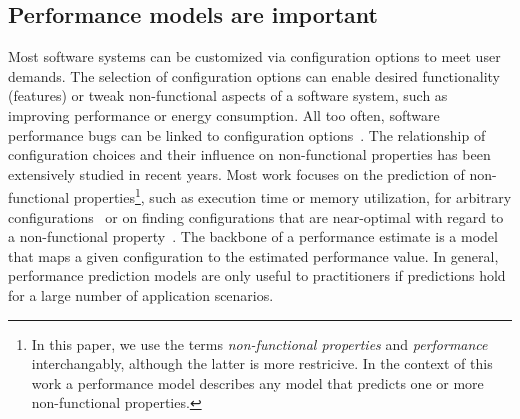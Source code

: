 \subsection*{Performance models are important}
Most software systems can be customized via configuration options to meet user demands. The selection of configuration options can enable desired functionality (features) or tweak non-functional aspects of a software system, such as improving performance or energy consumption. 
All too often, software performance bugs can be linked to configuration options~\cite{han_empirical_2016}. 
The relationship of configuration choices and their influence on non-functional properties has been extensively studied in recent years. Most work focuses on the prediction of non-functional properties\footnote{In this paper, we use the terms \textit{non-functional properties} and \textit{performance} interchangably, although the latter is more restricive. In the context of this work a performance model describes any model that predicts one or more non-functional properties.}, such as execution time or memory utilization, for arbitrary configurations~\cite{dorn2020,siegmundPerformanceinfluenceModelsHighly2015,haDeepPerf2019,perfAL,guoVariabilityawarePerformancePrediction2013,sarkarCostEfficientSamplingPerformance,guo_2018_data,fourier_learning_2015,perLasso} or on finding configurations that are near-optimal with regard to a non-functional property~\cite{nairUsingBadLearners2017,nairFlash18,ohFindingNearoptimalConfigurations2017}. 
The backbone of a performance estimate is a model that maps a given configuration to the estimated performance value. 
In general, performance prediction models are only useful to practitioners if predictions hold for a large number of application scenarios.

